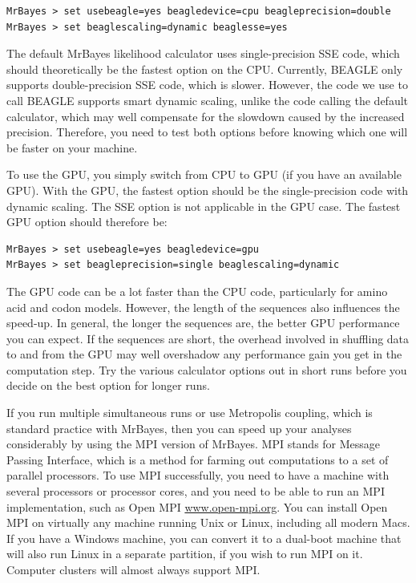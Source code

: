 \documentclass[12pt]{book}
\begin{document}
\begin{Verbatim}
MrBayes > set usebeagle=yes beagledevice=cpu beagleprecision=double
MrBayes > set beaglescaling=dynamic beaglesse=yes
\end{Verbatim}

The default MrBayes likelihood calculator uses single-precision SSE code, which should
theoretically be the fastest option on the CPU. Currently, BEAGLE only supports double-precision
SSE code, which is slower. However, the code we use to call BEAGLE supports smart dynamic scaling,
unlike the code calling the default calculator, which may well compensate for the slowdown caused
by the increased precision. Therefore, you need to test both options before knowing which one will
be faster on your machine.

To use the GPU, you simply switch from CPU to GPU (if you have an available GPU). With the GPU, the
fastest option should be the single-precision code with dynamic scaling. The SSE option is not
applicable in the GPU case. The fastest GPU option should therefore be:

\begin{Verbatim}
MrBayes > set usebeagle=yes beagledevice=gpu
MrBayes > set beagleprecision=single beaglescaling=dynamic
\end{Verbatim}

The GPU code can be a lot faster than the CPU code, particularly for amino acid and codon models.
However, the length of the sequences also influences the speed-up. In general, the longer the
sequences are, the better GPU performance you can expect. If the sequences are short, the overhead
involved in shuffling data to and from the GPU may well overshadow any performance gain you get in
the computation step. Try the various calculator options out in short runs before you decide on the
best option for longer runs.

If you run multiple simultaneous runs or use Metropolis coupling, which is standard practice with
MrBayes, then you can speed up your analyses considerably by using the MPI version of MrBayes. MPI
stands for Message Passing Interface, which is a method for farming out computations to a set of
parallel processors. To use MPI successfully, you need to have a machine with several processors
or processor cores, and you need to be able to run an MPI implementation, such as Open MPI
\url{www.open-mpi.org}. You can install Open MPI on virtually any machine running Unix or Linux,
including all modern Macs. If you have a Windows machine, you can convert it to a dual-boot machine
that will also run Linux in a separate partition, if you wish to run MPI on it. Computer clusters
will almost always support MPI.
\end{document}
